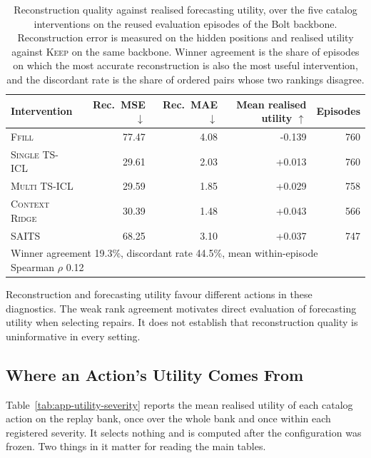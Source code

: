\documentclass{article}
\begin{document}
\begin{table}[!t]
  \caption{Reconstruction quality against realised forecasting utility, over the five catalog
  interventions on the reused evaluation episodes of the Bolt backbone. Reconstruction error is measured on the
  hidden positions and realised utility against \textsc{Keep} on the same backbone. Winner
  agreement is the share of episodes on which the most accurate reconstruction is also the most
  useful intervention, and the discordant rate is the share of ordered pairs whose two rankings
  disagree.}
  \label{tab:app-recutils}
  \centering
  \small
  \setlength{\tabcolsep}{4pt}
\begin{tabular*}{\textwidth}{@{\extracolsep{\fill}}lrrrr@{}}
    \toprule
    Intervention & Rec.\ MSE $\downarrow$ & Rec.\ MAE $\downarrow$
                 & Mean realised utility $\uparrow$ & Episodes \\
    \midrule
    \textsc{Ffill}         & 77.47  & 4.08  & -0.139  & 760 \\
    \textsc{Single TS-ICL} & 29.61 & 2.03 & +0.013 & 760 \\
    \textsc{Multi TS-ICL}  & 29.59  & 1.85  & +0.029  & 758 \\
    \textsc{Context Ridge} & 30.39  & 1.48  & +0.043  & 566 \\
    \textsc{SAITS}         & 68.25  & 3.10  & +0.037  & 747 \\
    \midrule
    \multicolumn{5}{l}{\footnotesize Winner agreement 19.3\%, discordant rate
    44.5\%, mean within-episode Spearman $\rho$ 0.12} \\
    \bottomrule
  \end{tabular*}
\end{table}

Reconstruction and forecasting utility favour different actions in these diagnostics.
The weak rank agreement motivates direct evaluation of forecasting utility when selecting
repairs. It does not establish that reconstruction quality is uninformative in every setting.

\subsection{Where an Action's Utility Comes From}
\label{app:utility-by-severity}
Table~\ref{tab:app-utility-severity} reports the mean realised utility of each catalog action
on the replay bank, once over the whole bank and once within each registered severity. It
selects nothing and is computed after the configuration was frozen. Two things in it matter for
reading the main tables.
\end{document}
